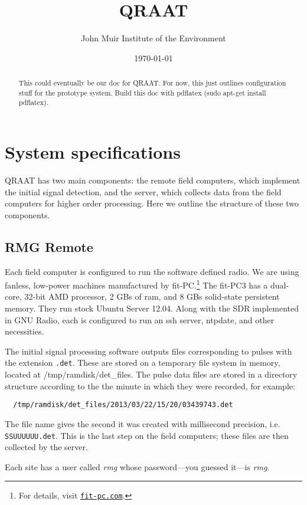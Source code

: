 \documentclass[letter]{article}
\author{John Muir Institute of the Environment}
\date{\today}
\title{QRAAT}
\newcounter{foot}
\begin{document}
\maketitle

\begin{abstract}
This could eventually be our doc for QRAAT. For now, this just outlines configuration 
stuff for the prototype system. Build this doc with pdflatex (sudo apt-get install pdflatex). 
\end{abstract}

\tableofcontents



\section{System specifications}
QRAAT has two main components: the remote field computers, which implement the initial 
signal detection, and the server, which collects data from the field computers for 
higher order processing. Here we outline the structure of these two components. 

\subsection{RMG Remote}
Each field computer is configured to run the software defined radio. We are using 
fanless, low-power machines manufactured by fit-PC.\footnote{For details, visit
\href{http://www.fit-pc.com}{\tt fit-pc.com}.} The fit-PC3 has a dual-core, 32-bit AMD
processor, 2 GBs of ram, and 8 GBs solid-state persistent memory. They 
run stock Ubuntu Server 12.04. Along with the SDR implemented in GNU Radio, each is 
configured to run an ssh server, ntpdate, and other necessities. 

The initial signal processing software outputs files corresponding to pulses 
with the extension \texttt{.det}. These are stored on a temporary file system in memory, 
located at /tmp/ramdisk/det\_files. The pulse data files are stored in a directory 
structure according to the the minute in which they were recorded, for example: 
\begin{verbatim}
  /tmp/ramdisk/det_files/2013/03/22/15/20/03439743.det
\end{verbatim}
The file name gives the second it was created with millisecond precision, i.e. 
\texttt{SSUUUUUU.det}. This is the last step on the field computers; these files are 
then collected by the server. 

Each site has a user called \textit{rmg} whose password---you guessed it---is \textit{rmg}. 
\end{document}
